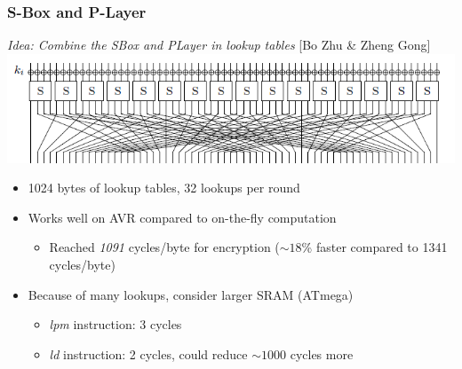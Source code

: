 \documentclass{beamer}
\begin{document}
\begin{frame}[fragile]
\frametitle{S-Box and P-Layer}
\emph{Idea: Combine the SBox and PLayer in lookup tables} [Bo Zhu \& Zheng Gong]
\includegraphics[width=\textwidth]{spnet.png}
\pause
\begin{itemize}[<+->]
\item 1024 bytes of lookup tables, 32 lookups per round
\item Works well on AVR compared to on-the-fly computation
  \begin{itemize}
    \item Reached \emph{1091} cycles/byte for encryption ($\sim18$\% faster compared to 1341 cycles/byte)
  \end{itemize}
\item Because of many lookups, consider larger SRAM (ATmega)
  \begin{itemize}
    \item \textit{lpm} instruction: 3 cycles
    \item \textit{ld} instruction: 2 cycles, could reduce $\sim1000$ cycles more
  \end{itemize}
\end{itemize}
\end{frame}
\end{document}
